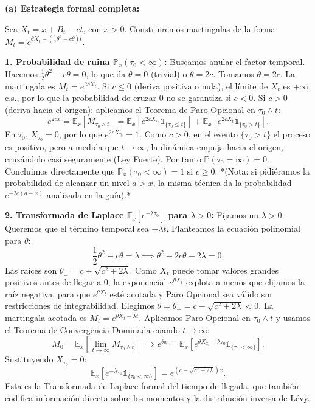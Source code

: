 \documentclass[11pt, letterpaper]{article}
\begin{document}
\begin{solucion}
    \vspace{3mm}
    \textbf{(a) Estrategia formal completa:}

    Sea $X_t = x + B_t - ct$, con $x > 0$. Construiremos martingalas de la forma $M_t = e^{\theta X_t - (\frac{1}{2}\theta^2 - c\theta)t}$.

    \textbf{1. Probabilidad de ruina $\mathbb{P}_x(\tau_0 < \infty)$:}
    Buscamos anular el factor temporal. Hacemos $\frac{1}{2}\theta^2 - c\theta = 0$, lo que da $\theta = 0$ (trivial) o $\theta = 2c$.
    Tomamos $\theta = 2c$. La martingala es $M_t = e^{2c X_t}$.
    Si $c \le 0$ (deriva positiva o nula), el límite de $X_t$ es $+\infty$ c.s., por lo que la probabilidad de cruzar $0$ no se garantiza si $c<0$.
    Si $c > 0$ (deriva hacia el origen): aplicamos el Teorema de Paro Opcional en $\tau_0 \wedge t$:
    \[ e^{2cx} = \mathbb{E}_x[M_{\tau_0 \wedge t}] = \mathbb{E}_x[e^{2cX_{\tau_0}} \mathbb{1}_{\{\tau_0 \le t\}}] + \mathbb{E}_x[e^{2cX_t} \mathbb{1}_{\{\tau_0 > t\}}]. \]
    En $\tau_0$, $X_{\tau_0} = 0$, por lo que $e^{2cX_{\tau_0}} = 1$.
    Como $c > 0$, en el evento $\{\tau_0 > t\}$ el proceso es positivo, pero a medida que $t \to \infty$, la dinámica empuja hacia el origen, cruzándolo casi seguramente (Ley Fuerte). Por tanto $\mathbb{P}(\tau_0 = \infty) = 0$.
    Concluimos directamente que $\mathbb{P}_x(\tau_0 < \infty) = 1$ si $c \ge 0$.
    *(Nota: si pidiéramos la probabilidad de alcanzar un nivel $a > x$, la misma técnica da la probabilidad $e^{-2c(a-x)}$ analizada en la guía).*

    \textbf{2. Transformada de Laplace $\mathbb{E}_x[e^{-\lambda \tau_0}]$ para $\lambda > 0$:}
    Fijamos un $\lambda > 0$. Queremos que el término temporal sea $-\lambda t$. Planteamos la ecuación polinomial para $\theta$:
    \[ \frac{1}{2}\theta^2 - c\theta = \lambda \implies \theta^2 - 2c\theta - 2\lambda = 0. \]
    Las raíces son $\theta_\pm = c \pm \sqrt{c^2 + 2\lambda}$.
    Como $X_t$ puede tomar valores grandes positivos antes de llegar a 0, la exponencial $e^{\theta X_t}$ explota a menos que elijamos la raíz negativa, para que $e^{\theta X_t}$ esté acotada y Paro Opcional sea válido sin restricciones de integrabilidad.
    Elegimos $\theta = \theta_- = c - \sqrt{c^2 + 2\lambda} < 0$.
    La martingala acotada es $M_t = e^{\theta X_t - \lambda t}$.
    Aplicamos Paro Opcional en $\tau_0 \wedge t$ y usamos el Teorema de Convergencia Dominada cuando $t \to \infty$:
    \[ M_0 = \mathbb{E}_x[\lim_{t \to \infty} M_{\tau_0 \wedge t}] \implies e^{\theta x} = \mathbb{E}_x[e^{\theta X_{\tau_0} - \lambda \tau_0} \mathbb{1}_{\{\tau_0 < \infty\}}]. \]
    Sustituyendo $X_{\tau_0} = 0$:
    \[ \mathbb{E}_x[e^{-\lambda \tau_0} \mathbb{1}_{\{\tau_0 < \infty\}}] = e^{(c - \sqrt{c^2 + 2\lambda})x}. \]
    Esta es la Transformada de Laplace formal del tiempo de llegada, que también codifica información directa sobre los momentos y la distribución inversa de Lévy.


\end{solucion}
\end{document}
